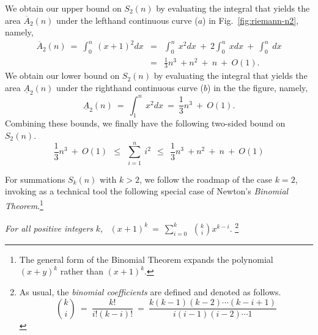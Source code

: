 We obtain our upper bound on $S_2(n)$ by evaluating the integral that
yields the area $\overline{A}_2(n)$ under the lefthand continuous
curve ($a$) in Fig.~\ref{fig:riemann-n2}, namely,
\begin{eqnarray}
\label{eq:upper-integral-x2}
\overline{A}_2(n) \ = \
\int_0^n \ (x+1)^2 dx & = &
  \int_0^n \ x^2 dx \ + \ 2 \int_0^n \ x dx \ + \ \int_0^n \ dx \\
\nonumber
 & = & \frac{1}{3} n^3 \ + n^2 \ + \ n \ + \ O(1).
\end{eqnarray}
We obtain our lower bound on $S_2(n)$ by evaluating the integral that
yields the area $\underline{A}_2(n)$ under the righthand continuous
curve ($b$) in the the figure, namely,
\begin{equation}
\label{eq:lower-integral-x2}
\underline{A}_2(n) \ = \
\int_1^n \ x^2 dx \ = \ \frac{1}{3} n^3 \ + \ O(1).
\end{equation}
Combining these bounds, we finally have the following two-sided bound
on $S_2(n)$.
\begin{equation}
\label{eq:bounds-sum-x2}
\frac{1}{3} n^3 \ + \ O(1)
  \ \ \leq \ \ \sum_{i=1}^n \ i^2
  \ \ \leq \ \ \frac{1}{3} n^3 \ + n^2 \ + \ n \ + \ O(1)
\end{equation}

\medskip

For summations $S_k(n)$ with $k >2$, we follow the roadmap of the case
$k=2$, invoking as a technical tool the following special case of
Newton's {\it Binomial Theorem}.\footnote{The general form of the
  Binomial Theorem expands the polynomial $(x+y)^k$ rather than
  $(x+1)^k$.}

\bigskip

{\em
For all positive integers} $k$, \
$\displaystyle (x+1)^k \ = \
\sum_{i=0}^k \ \ {k \choose i} x^{k-i}$.
\footnote{
As usual, the {\it binomial coefficients} are defined and denoted as
follows.
\[
{k \choose i} \ = \ \frac{k!}{i!(k-i)!} \ = \
\frac{k(k-1)(k-2) \cdots (k-i+1)}{i(i-1)(i-2) \cdots 1}
\]}

